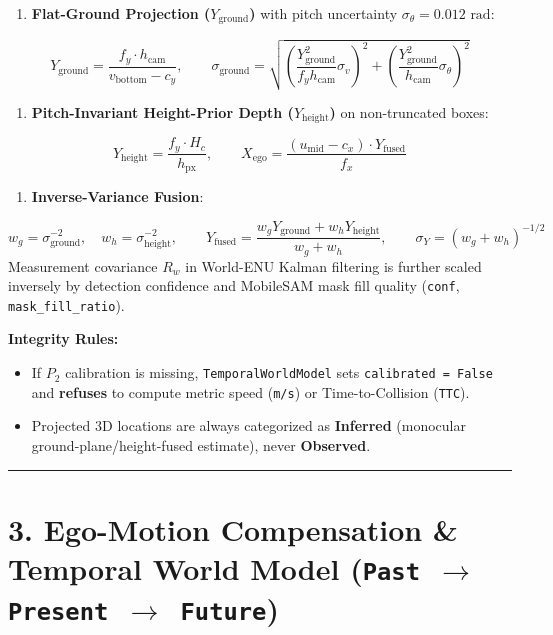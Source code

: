 \documentclass[10.5pt,a4paper]{article}
\begin{document}
\begin{enumerate}[leftmargin=1.8em,itemsep=2pt]
\item \textbf{Flat-Ground Projection ($Y_{\text{ground}}$)} with pitch uncertainty $\sigma_\theta = 0.012\text{ rad}$:
\end{enumerate}
\[Y_{\text{ground}} = \frac{f_y \cdot h_{\text{cam}}}{v_{\text{bottom}} - c_y}, \qquad \sigma_{\text{ground}} = \sqrt{\left(\frac{Y_{\text{ground}}^2}{f_y h_{\text{cam}}}\sigma_v\right)^2 + \left(\frac{Y_{\text{ground}}^2}{h_{\text{cam}}}\sigma_\theta\right)^2}\]
\begin{enumerate}[leftmargin=1.8em,itemsep=2pt]
\item \textbf{Pitch-Invariant Height-Prior Depth ($Y_{\text{height}}$)} on non-truncated boxes:
\end{enumerate}
\[Y_{\text{height}} = \frac{f_y \cdot H_c}{h_{\text{px}}}, \qquad X_{\text{ego}} = \frac{(u_{\text{mid}} - c_x) \cdot Y_{\text{fused}}}{f_x}\]
\begin{enumerate}[leftmargin=1.8em,itemsep=2pt]
\item \textbf{Inverse-Variance Fusion}:
\end{enumerate}
\[w_g = \sigma_{\text{ground}}^{-2}, \quad w_h = \sigma_{\text{height}}^{-2}, \qquad Y_{\text{fused}} = \frac{w_g Y_{\text{ground}} + w_h Y_{\text{height}}}{w_g + w_h}, \qquad \sigma_Y = (w_g + w_h)^{-1/2}\]
Measurement covariance $R_w$ in World-ENU Kalman filtering is further scaled inversely by detection confidence and MobileSAM mask fill quality (\texttt{conf}, \texttt{mask\_\allowbreak{}fill\_\allowbreak{}ratio}).


\textbf{Integrity Rules:}

\begin{itemize}[leftmargin=1.5em,itemsep=2pt]
\item If $P_2$ calibration is missing, \texttt{TemporalWorldModel} sets \texttt{calibrated = False} and \textbf{refuses} to compute metric speed (\texttt{m/\allowbreak{}s}) or Time-to-Collision (\texttt{TTC}).
\item Projected 3D locations are always categorized as \textbf{Inferred} (monocular ground-plane/height-fused estimate), never \textbf{Observed}.
\end{itemize}

\par\noindent\rule{\textwidth}{0.4pt}\par\medskip

\section{3. Ego-Motion Compensation \& Temporal World Model (\texttt{Past $\rightarrow$ Present $\rightarrow$ Future})}
\end{document}
